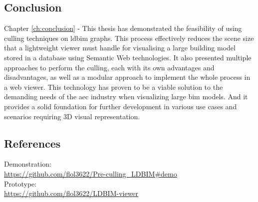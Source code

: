 \begin{refsection}
\begin{multicols}{2}
        \subsection*{Conclusion}
        \textsf{Chapter \ref{ch:conclusion} -} This thesis has demonstrated the feasibility of using culling techniques on \ac{ldbim} graphs. This process effectively reduces the scene size that a lightweight viewer must handle for visualising a large building model stored in a database using Semantic Web technologies. It also presented multiple approaches to perform the culling, each with its own advantages and disadvantages, as well as a modular approach to implement the whole process in a web viewer. This technology has proven to be a viable solution to the demanding needs of the \ac{aec} industry when visualizing large \ac{bim} models. And it provides a solid foundation for further development in various use cases and scenarios requiring 3D visual representation.

        \subsection*{References}
        {\renewcommand*{\bibfont}{\small}
            \printbibliography}
        {\footnotesize
            \textsf{Demonstration:}\\
            \url{https://github.com/flol3622/Pre-culling_LDBIM#demo}\\
            \textsf{Prototype:}\\
            \url{https://github.com/flol3622/LDBIM-viewer}}


    \end{multicols}

\end{refsection}